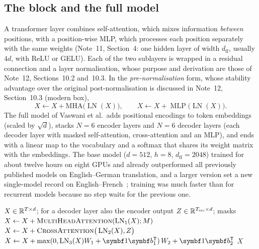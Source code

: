 \documentclass[11pt]{article}
\newcommand{\onev}{\vect{1}}
\newcommand{\LN}{\operatorname{LN}}
\newcommand{\MLP}{\operatorname{MLP}}
\begin{document}
\subsection{The block and the full model}\label{sec:block}

A transformer layer combines self-attention, which mixes information \emph{between} positions, with a position-wise MLP,
which processes each position separately with the same weights (Note~11, Section~4: one hidden layer of width $d_{\mathrm{ff}}$,
usually $4d$, with ReLU or GELU). Each of the two sublayers is wrapped in a residual connection and a layer normalisation,
whose purpose and derivation are those of Note~12, Sections~10.2 and~10.3. In the \emph{pre-normalisation} form, whose
stability advantage over the original post-normalisation is discussed in Note~12, Section~10.3 (modern box),
\begin{equation}\label{eq:block}
  X \gets X + \mathrm{MHA}\big(\LN(X)\big), \qquad X \gets X + \MLP\big(\LN(X)\big) .
\end{equation}
The full model of Vaswani et al.\ adds positional
encodings to token embeddings (scaled by $\sqrt{d}$), stacks $N = 6$ encoder layers and $N = 6$ decoder layers (each decoder
layer with masked self-attention, cross-attention and an MLP), and ends with a linear map to the vocabulary and a softmax that
shares its weight matrix with the embeddings. The base model ($d = 512$, $h = 8$, $d_{\mathrm{ff}} = 2048$) trained for about twelve hours on eight GPUs and already
outperformed all previously published models on English--German translation, and a larger version set a new single-model
record on English--French~\cite{vaswani2017}; training was much faster than for recurrent models because no step waits for
the previous one.

\begin{algorithm}[htbp]
\caption{Transformer layer (pre-normalisation), encoder or decoder}\label{alg:block}
\begin{algorithmic}[1]
\Require $X \in \mathbb{R}^{T \times d}$; for a decoder layer also the encoder output $Z \in \mathbb{R}^{T_{\mathrm{src}} \times d}$; masks
  \State $X \gets X + \Call{MultiHeadAttention}{\LN_1(X); M}$ 
    \State $X \gets X + \textsc{CrossAttention}\big(\LN_2(X), Z\big)$ 
  \EndIf
  \State $X \gets X + \max(0, \LN_3(X)W_1 + \onev\vect{b}_1\T)\,W_2 + \onev\vect{b}_2\T$ 
  \State \Return $X$
\EndFunction
\end{algorithmic}
\end{algorithm}
\end{document}
